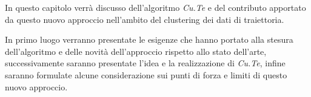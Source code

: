 In questo capitolo verrà discusso dell'algoritmo \textit{Cu.Te} e
del contributo apportato da questo nuovo approccio nell'ambito del clustering dei dati di traiettoria.

In primo luogo verranno presentate le esigenze che hanno portato alla stesura dell'algoritmo e delle novità dell'approccio rispetto allo stato dell'arte,
successivamente saranno presentate l'idea e la realizzazione di \textit{Cu.Te},
infine saranno formulate alcune considerazione sui punti di forza e limiti di questo nuovo approccio.
